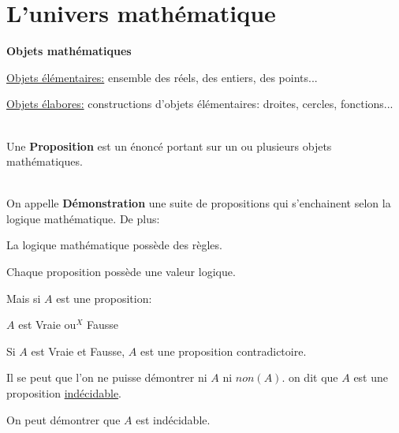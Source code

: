\documentclass[12pt,twoside,a4paper]{article}
\author{MPSI 2}
\begin{document}
	\maketitle
	\section{L'univers math\'ematique}
		\begin{liste}
			\item\textbf{Objets math\'ematiques}
				\begin{tab}\begin{liste}
					\item \underline{Objets \'el\'ementaires:} ensemble des r\'eels, des entiers, des points...
					\item \underline{Objets \'elabores:} constructions d'objets \'el\'ementaires: droites, cercles, fonctions...\\\\
				\end{liste}\end{tab}
			\item Une \textbf{Proposition} est un \'enonc\'e portant sur un ou plusieurs objets math\'ematiques.\\\\
			\item On appelle \textbf{D\'emonstration} une suite de propositions qui s'enchainent selon la logique math\'ematique. De plus:
				\begin{liste}
					\item La logique math\'ematique poss\`ede des r\`egles.
					\item Chaque proposition poss\`ede une valeur logique.\\
				\end{liste}
				Mais si $A$ est une proposition:
				\begin{liste}
					\item $A$ est Vraie ou$^X$ Fausse
					\item Si $A$ est Vraie et Fausse, $A$ est une proposition contradictoire.
					\item Il se peut que l'on ne puisse d\'emontrer ni $A$ ni $non(A)$. on dit que $A$ est une proposition \underline{ind\'ecidable}.
					\item On peut d\'emontrer que $A$ est ind\'ecidable.
				\end{liste}
		\end{liste}
\end{document}
